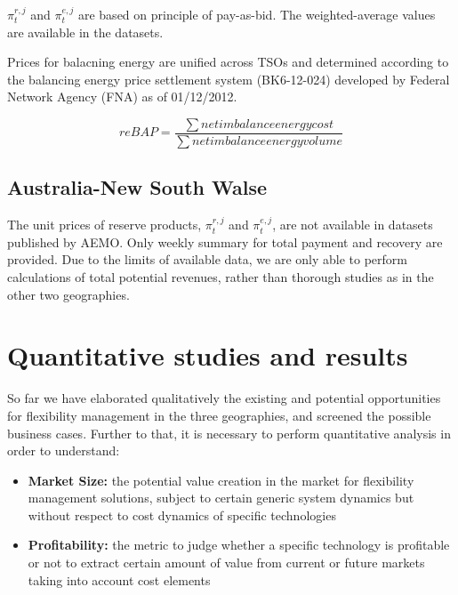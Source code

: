 $\pi_t^{r,j}$ and $\pi_t^{e,j}$ are based on principle of pay-as-bid. The weighted-average values are available in the datasets.



Prices for balacning energy are unified across TSOs and determined according to the  balancing energy price settlement system (BK6-12-024) developed by Federal Network Agency (FNA) as of 01/12/2012.

\begin{equation}
\label{eq:reBAP}
reBAP = \frac{\sum net imbalance energy cost}{\sum net imbalance energy volume}
\end{equation}

\subsection{Australia-New South Walse}


The unit prices of reserve products, $\pi_t^{r,j}$ and $\pi_t^{e,j}$, are not available in datasets published by AEMO. Only weekly summary for total payment and recovery are provided. Due to the limits of available data, we are only able to perform calculations of total potential revenues, rather than thorough studies as in the other two geographies.

\newpage

\section{Quantitative studies and results}
So far we have elaborated qualitatively the existing and potential opportunities for flexibility management in the three geographies, and screened the possible business cases. Further to that, it is necessary to perform quantitative analysis in order to understand:

\begin{itemize}
	\item \textbf{Market Size:} the potential value creation in the market for flexibility management solutions, subject to certain generic system dynamics but without respect to cost dynamics of specific technologies
	\item \textbf{Profitability:} the metric to judge whether a specific technology is profitable or not to extract certain amount of value from current or future markets taking into account cost elements
\end{itemize}

